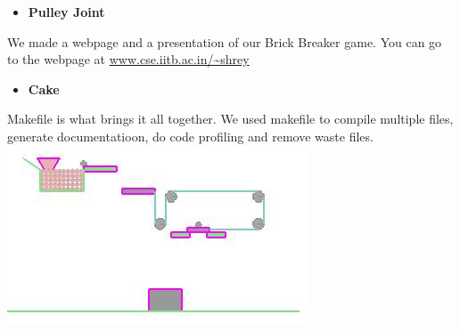 \documentclass{article}
\begin{document}
\begin{itemize}
        \begin{itemize}[label=$\blacksquare$] \vspace{0cm}
            \item \textbf{\Large Pulley Joint} 
        \end{itemize}
        \large We made a webpage and a presentation of our Brick Breaker game. You can go to the webpage at \url{www.cse.iitb.ac.in/~shrey}\\ \vspace{0.65 cm}
        
        \begin{itemize}[label=$\blacksquare$] \vspace{0cm}
            \item \textbf{\Large Cake} 
        \end{itemize}
        \large Makefile is what brings it all together. We used makefile to compile multiple files, generate documentatioon, do code profiling and remove waste files.\\ \vspace{0.65 cm}
	\includegraphics[width=1 \linewidth]{suraj.jpg}\\
    \end{itemize}
\end{document}
